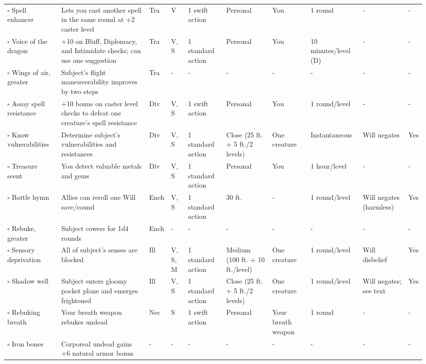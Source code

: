 \documentclass[12pt, a4paper]{article}
\begin{document}
\begin{center}
\begin{longtable}[H]{ p{8em} p{15em} p{2em} p{5em} p{6em} p{6em} p{10em} p{6em} p{5em} p{2em} }
    \(\square\) Spell enhancer & Lets you cast another spell in the same round at +2 caster level & Tra & V & 1 swift action & Personal & You & 1 round & - & -\\
    \(\square\) Voice of the dragon & +10 on Bluff, Diplomacy, and Intimidate checks; can use one suggestion & Tra & V, S & 1 standard action & Personal & You & 10 minutes/level (D) & - & -\\
    \(\square\) Wings of air, greater & Subject’s ﬂight maneuverability improves by two steps & Tra & - & - & - & - & - & - & -\\
    \(\square\) Assay spell resistance & +10 bonus on caster level checks to defeat one creature’s spell resistance & Div & V, S & 1 swift action & Personal & You & 1 round/level & - & -\\
    \(\square\) Know vulnerabilities & Determine subject’s vulnerabilities and resistances & Div & V, S & 1 standard action & Close (25 ft. + 5 ft./2 levels) & One creature & Instantaneous & Will negates & Yes\\
    \(\square\) Treasure scent & You detect valuable metals and gems & Div & V, S & 1 standard action & Personal & You & 1 hour/level & - & -\\
    \(\square\) Battle hymn & Allies can reroll one Will save/round & Ench & V, S & 1 standard action & 30 ft. & - & 1 round/level & Will negates (harmless) & Yes \\
    \(\square\) Rebuke, greater & Subject cowers for 1d4 rounds & Ench & - & - & - & - & - & - & -\\
    \(\square\) Sensory deprivation & All of subject’s senses are blocked & Ill & V, S, M & 1 standard action & Medium (100 ft. + 10 ft./level) & One creature & 1 round/level & Will disbelief & Yes\\
    \(\square\) Shadow well & Subject enters gloomy pocket plane and emerges frightened & Ill & V, S & 1 standard action & Close (25 ft. + 5 ft./2 levels) & One creature & 1 round/level & Will negates; see text & Yes\\
    \(\square\) Rebuking breath & Your breath weapon rebukes undead & Nec & S & 1 swift action & Personal & Your breath weapon & 1 round & - & -\\
    \(\square\) Iron bones & Corporeal undead gains +6 natural armor bonus & - & - & - & - & - & - & - & -\\
  \end{longtable}


\end{center}
\end{document}
